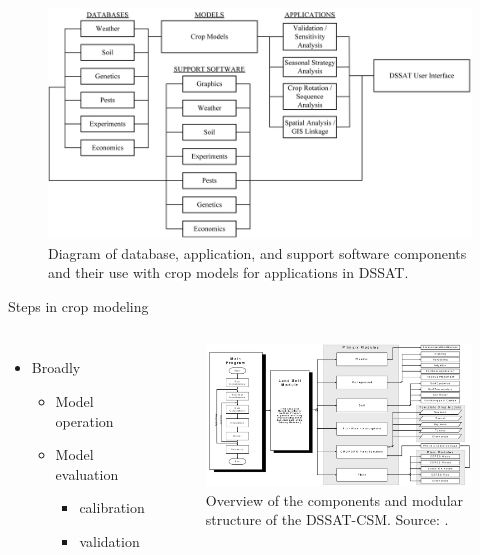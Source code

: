 \documentclass[11pt,dvipsnames,ignorenonframetext,aspectratio=169]{beamer}
\providecommand{\tightlist}{%
  \setlength{\itemsep}{0pt}\setlength{\parskip}{0pt}}
\newcommand{\bcolumns}{\begin{columns}[T, onlytextwidth]}
\newcommand{\ecolumns}{\end{columns}}
\begin{document}
\begin{frame}{}
\protect\hypertarget{section-3}{}
\begin{figure}
\includegraphics[width=0.8\linewidth]{../images/csm_dssat_framework} \caption{Diagram of database, application, and support software components and their use with crop models for applications in DSSAT.}\label{fig:dssat-framework}
\end{figure}
\end{frame}

\begin{frame}{Steps in crop modeling}
\protect\hypertarget{steps-in-crop-modeling}{}
\bcolumns
{}
\footnotesize

\begin{itemize}
\tightlist
\item
  Broadly

  \begin{itemize}
  \scriptsize
  \item Model operation
  \item Model evaluation
    \begin{itemize}
    \scriptsize
    \item calibration
    \item validation
    \end{itemize}
  \end{itemize}
\end{itemize}


\begin{figure}
\includegraphics[width=0.88\linewidth]{../images/modular_operation_dssat} \caption{Overview of the components and modular structure of the DSSAT-CSM. Source: \cite{jones2003dssat}.}\label{fig:modular-organization-dssat}
\end{figure}

\ecolumns
\end{frame}
\end{document}
